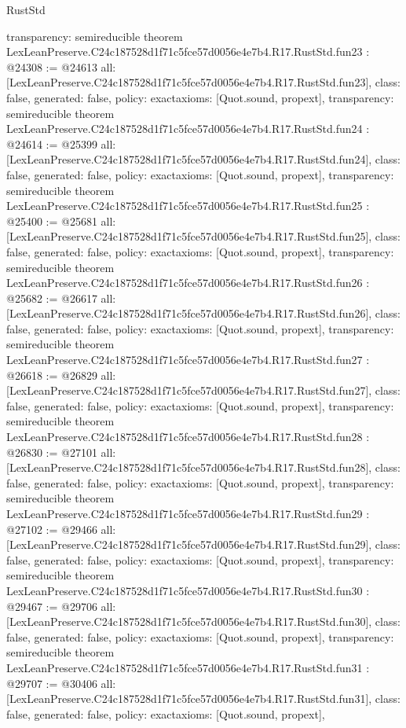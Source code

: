 \begin{lexlean}{RustStd}
\begin{coremodule}
{  transparency: semireducible
}
theorem LexLeanPreserve.C24c187528d1f71c5fce57d0056e4e7b4.R17.RustStd.fun23 : @24308 := @24613 {
  all: [LexLeanPreserve.C24c187528d1f71c5fce57d0056e4e7b4.R17.RustStd.fun23],
  class: false,
  generated: false,
  policy: exact{axioms: [Quot.sound, propext]},
  transparency: semireducible
}
theorem LexLeanPreserve.C24c187528d1f71c5fce57d0056e4e7b4.R17.RustStd.fun24 : @24614 := @25399 {
  all: [LexLeanPreserve.C24c187528d1f71c5fce57d0056e4e7b4.R17.RustStd.fun24],
  class: false,
  generated: false,
  policy: exact{axioms: [Quot.sound, propext]},
  transparency: semireducible
}
theorem LexLeanPreserve.C24c187528d1f71c5fce57d0056e4e7b4.R17.RustStd.fun25 : @25400 := @25681 {
  all: [LexLeanPreserve.C24c187528d1f71c5fce57d0056e4e7b4.R17.RustStd.fun25],
  class: false,
  generated: false,
  policy: exact{axioms: [Quot.sound, propext]},
  transparency: semireducible
}
theorem LexLeanPreserve.C24c187528d1f71c5fce57d0056e4e7b4.R17.RustStd.fun26 : @25682 := @26617 {
  all: [LexLeanPreserve.C24c187528d1f71c5fce57d0056e4e7b4.R17.RustStd.fun26],
  class: false,
  generated: false,
  policy: exact{axioms: [Quot.sound, propext]},
  transparency: semireducible
}
theorem LexLeanPreserve.C24c187528d1f71c5fce57d0056e4e7b4.R17.RustStd.fun27 : @26618 := @26829 {
  all: [LexLeanPreserve.C24c187528d1f71c5fce57d0056e4e7b4.R17.RustStd.fun27],
  class: false,
  generated: false,
  policy: exact{axioms: [Quot.sound, propext]},
  transparency: semireducible
}
theorem LexLeanPreserve.C24c187528d1f71c5fce57d0056e4e7b4.R17.RustStd.fun28 : @26830 := @27101 {
  all: [LexLeanPreserve.C24c187528d1f71c5fce57d0056e4e7b4.R17.RustStd.fun28],
  class: false,
  generated: false,
  policy: exact{axioms: [Quot.sound, propext]},
  transparency: semireducible
}
theorem LexLeanPreserve.C24c187528d1f71c5fce57d0056e4e7b4.R17.RustStd.fun29 : @27102 := @29466 {
  all: [LexLeanPreserve.C24c187528d1f71c5fce57d0056e4e7b4.R17.RustStd.fun29],
  class: false,
  generated: false,
  policy: exact{axioms: [Quot.sound, propext]},
  transparency: semireducible
}
theorem LexLeanPreserve.C24c187528d1f71c5fce57d0056e4e7b4.R17.RustStd.fun30 : @29467 := @29706 {
  all: [LexLeanPreserve.C24c187528d1f71c5fce57d0056e4e7b4.R17.RustStd.fun30],
  class: false,
  generated: false,
  policy: exact{axioms: [Quot.sound, propext]},
  transparency: semireducible
}
theorem LexLeanPreserve.C24c187528d1f71c5fce57d0056e4e7b4.R17.RustStd.fun31 : @29707 := @30406 {
  all: [LexLeanPreserve.C24c187528d1f71c5fce57d0056e4e7b4.R17.RustStd.fun31],
  class: false,
  generated: false,
  policy: exact{axioms: [Quot.sound, propext]},
}
\end{coremodule}
\end{lexlean}

